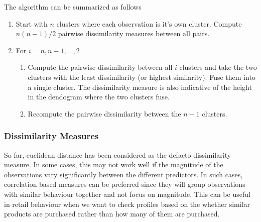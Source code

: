\documentclass[11pt, a4paper]{article}
\begin{document}
    The algorithm can be summarized as follows
    \begin{enumerate}
        \item Start with $n$ clusters where each observation is it's own cluster. Compute $n(n-1)/2$ pairwise dissimilarity measures between all pairs.
        \item For $i=n, n-1, \ldots, 2$
        \begin{enumerate}
            \item Compute the pairwise dissimilarity between all $i$ clusters and take the two clusters with the least dissimilarity (or highest similarity). Fuse them into a single cluster. The dissimilarity measure is also indicative of the height in the dendogram where the two clusters fuse.
            \item Recompute the pairwise dissimilarity between the $n-1$ clusters.
        \end{enumerate}
    \end{enumerate}


    \subsubsection{Dissimilarity Measures}
    So far, euclidean distance has been considered as the defacto dissimilarity measure. In some cases, this may not work well if the magnitude of the observations vary significantly between the different predictors. In such cases, correlation based measures can be preferred since they will group observations with similar behaviour together and not focus on magnitude.\newline
    This can be useful in retail behaviour when we want to check profiles based on the whether similar products are purchased rather than how many of them are purchased.


\end{document}
